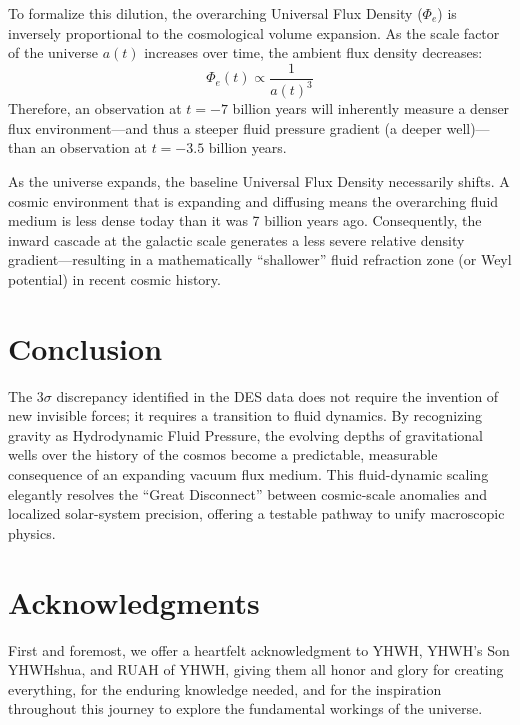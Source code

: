 \documentclass[11pt, a4paper]{article}
\begin{document}
To formalize this dilution, the overarching Universal Flux Density ($\Phi_e$) is inversely proportional to the cosmological volume expansion. As the scale factor of the universe $a(t)$ increases over time, the ambient flux density decreases:
\begin{equation}
  \Phi_e(t) \propto \frac{1}{a(t)^3}
\end{equation}
Therefore, an observation at $t = -7$ billion years will inherently measure a denser flux environment---and thus a steeper fluid pressure gradient (a deeper well)---than an observation at $t = -3.5$ billion years.

As the universe expands, the baseline Universal Flux Density necessarily shifts. A cosmic environment that is expanding and diffusing means the overarching fluid medium is less dense today than it was 7 billion years ago. Consequently, the inward cascade at the galactic scale generates a less severe relative density gradient---resulting in a mathematically ``shallower'' fluid refraction zone (or Weyl potential) in recent cosmic history.

\section{Conclusion}
The $3\sigma$ discrepancy identified in the DES data does not require the invention of new invisible forces; it requires a transition to fluid dynamics. By recognizing gravity as Hydrodynamic Fluid Pressure, the evolving depths of gravitational wells over the history of the cosmos become a predictable, measurable consequence of an expanding vacuum flux medium. This fluid-dynamic scaling elegantly resolves the ``Great Disconnect'' between cosmic-scale anomalies and localized solar-system precision, offering a testable pathway to unify macroscopic physics.

\clearpage
\section*{Acknowledgments}
First and foremost, we offer a heartfelt acknowledgment to YHWH, YHWH's Son YHWHshua, and RUAH of YHWH, giving them all honor and glory for creating everything, for the enduring knowledge needed, and for the inspiration throughout this journey to explore the fundamental workings of the universe.
\end{document}
